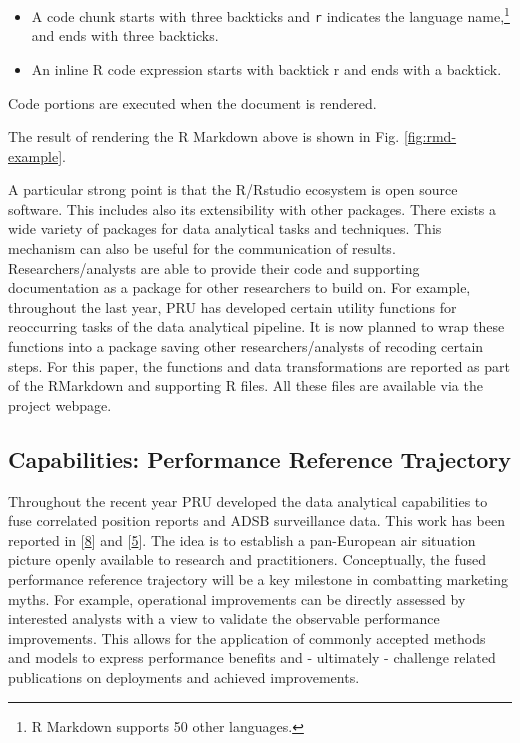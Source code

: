 \documentclass[conference,final,a4paper,]{IEEEtran}
\begin{document}
\begin{itemize}
\item
  A code chunk starts with three backticks and \texttt{r} indicates the
  language name,\footnote{R Markdown supports 50 other languages.} and
  ends with three backticks.
\item
  An inline R code expression starts with backtick r and ends with a
  backtick.
\end{itemize}

Code portions are executed when the document is rendered.

The result of rendering the R Markdown above is shown in Fig.
\ref{fig:rmd-example}.

A particular strong point is that the R/Rstudio ecosystem is open source
software. This includes also its extensibility with other packages.
There exists a wide variety of packages for data analytical tasks and
techniques. This mechanism can also be useful for the communication of
results. Researchers/analysts are able to provide their code and
supporting documentation as a package for other researchers to build on.
For example, throughout the last year, PRU has developed certain utility
functions for reoccurring tasks of the data analytical pipeline. It is
now planned to wrap these functions into a package saving other
researchers/analysts of recoding certain steps. For this paper, the
functions and data transformations are reported as part of the RMarkdown
and supporting R files. All these files are available via the project
webpage.

\subsection{Capabilities: Performance Reference
Trajectory}\label{capabilities-performance-reference-trajectory}

Throughout the recent year PRU developed the data analytical
capabilities to fuse correlated position reports and ADSB surveillance
data. This work has been reported in
{[}\protect\hyperlink{ref-koelle_open_2017}{8}{]} and
{[}\protect\hyperlink{ref-spinielli_2018}{5}{]}. The idea is to
establish a pan-European air situation picture openly available to
research and practitioners. Conceptually, the fused performance
reference trajectory will be a key milestone in combatting marketing
myths. For example, operational improvements can be directly assessed by
interested analysts with a view to validate the observable performance
improvements. This allows for the application of commonly accepted
methods and models to express performance benefits and - ultimately -
challenge related publications on deployments and achieved improvements.
\end{document}
